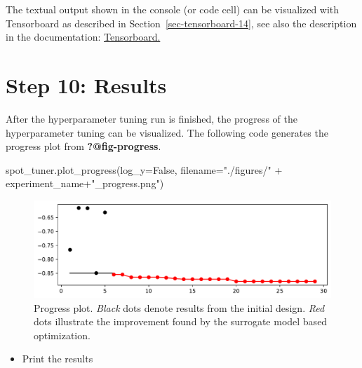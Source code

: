 \documentclass[
  letterpaper,
  DIV=11,
  numbers=noendperiod]{scrreprt}
\newenvironment{Shaded}{\begin{snugshade}}{\end{snugshade}}
\newcommand{\NormalTok}[1]{\textcolor[rgb]{0.00,0.23,0.31}{#1}}
\newcommand{\OperatorTok}[1]{\textcolor[rgb]{0.37,0.37,0.37}{#1}}
\newcommand{\StringTok}[1]{\textcolor[rgb]{0.13,0.47,0.30}{#1}}
\newcommand{\VariableTok}[1]{\textcolor[rgb]{0.07,0.07,0.07}{#1}}
\providecommand{\tightlist}{%
  \setlength{\itemsep}{0pt}\setlength{\parskip}{0pt}}\usepackage{longtable,booktabs,array}
\begin{document}
The textual output shown in the console (or code cell) can be visualized
with Tensorboard as described in Section~\ref{sec-tensorboard-14}, see
also the description in the documentation:
\href{https://sequential-parameter-optimization.github.io/spotPython/14_spot_ray_hpt_torch_cifar10.html\#sec-tensorboard-14}{Tensorboard.}

\hypertarget{sec-results-tuning-16}{%
\section{Step 10: Results}\label{sec-results-tuning-16}}

After the hyperparameter tuning run is finished, the progress of the
hyperparameter tuning can be visualized. The following code generates
the progress plot from \textbf{?@fig-progress}.

\begin{Shaded}
\begin{Highlighting}[]
\NormalTok{spot\_tuner.plot\_progress(log\_y}\OperatorTok{=}\VariableTok{False}\NormalTok{,}
\NormalTok{    filename}\OperatorTok{=}\StringTok{"./figures/"} \OperatorTok{+}\NormalTok{ experiment\_name}\OperatorTok{+}\StringTok{"\_progress.png"}\NormalTok{)}
\end{Highlighting}
\end{Shaded}

\begin{figure}[H]

{\centering \includegraphics{16_spot_hpt_sklearn_multiclass_classification_randomforest_files/figure-pdf/cell-27-output-1.pdf}

}

\caption{Progress plot. \emph{Black} dots denote results from the
initial design. \emph{Red} dots illustrate the improvement found by the
surrogate model based optimization.}

\end{figure}

\begin{itemize}
\tightlist
\item
  Print the results
\end{itemize}
\end{document}

